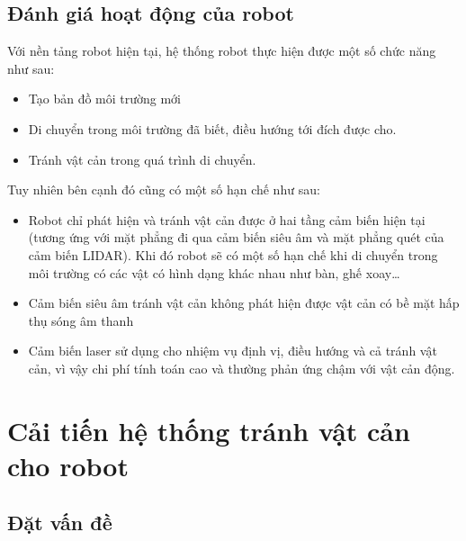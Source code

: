 \subsection{Đánh giá hoạt động của robot}

Với nền tảng robot hiện tại, hệ thống robot thực hiện được một số chức năng như sau:

\begin{itemize}
    \item Tạo bản đồ môi trường mới
    \item Di chuyển trong môi trường đã biết, điều hướng tới đích được cho.
    \item Tránh vật cản trong quá trình di chuyển.
\end{itemize}

Tuy nhiên bên cạnh đó cũng có một số hạn chế như sau:

\begin{itemize}
    \item Robot chỉ phát hiện và tránh vật cản được ở hai tầng cảm biến hiện tại (tương ứng với mặt phẳng đi qua cảm biến siêu âm và mặt phẳng quét của cảm biến LIDAR). Khi đó robot sẽ có một số hạn chế khi di chuyển trong môi trường có các vật có hình dạng khác nhau như bàn, ghế xoay\dots
    \item Cảm biến siêu âm tránh vật cản không phát hiện được vật cản có bề mặt hấp thụ sóng âm thanh
    \item Cảm biến laser sử dụng cho nhiệm vụ định vị, điều hướng và cả tránh vật cản, vì vậy chi phí tính toán cao và thường phản ứng chậm với vật cản động.
\end{itemize}


\section{Cải tiến hệ thống tránh vật cản cho robot}
\label{sec:caitienhethongtranhvatcan}

\subsection{Đặt vấn đề}

